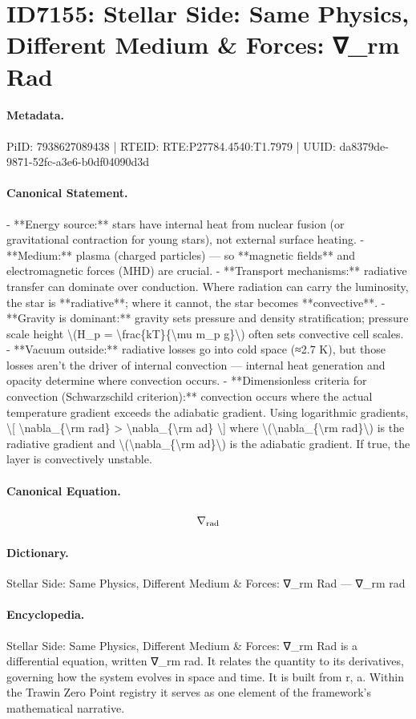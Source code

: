 \section*{ID7155: Stellar Side: Same Physics, Different Medium \& Forces: ∇\_rm Rad}
\paragraph{Metadata.}
PiID: 7938627089438 | RTEID: RTE:P27784.4540:T1.7979 | UUID: da8379de-9871-52fc-a3e6-b0df04090d3d

\paragraph{Canonical Statement.}
- **Energy source:** stars have internal heat from nuclear fusion (or gravitational contraction for young stars), not external surface heating. - **Medium:** plasma (charged particles) — so **magnetic fields** and electromagnetic forces (MHD) are crucial. - **Transport mechanisms:** radiative transfer can dominate over conduction. Where radiation can carry the luminosity, the star is **radiative**; where it cannot, the star becomes **convective**. - **Gravity is dominant:** gravity sets pressure and density stratification; pressure scale height \textbackslash{}(H\_p = \textbackslash{}frac\{kT\}\{\textbackslash{}mu m\_p g\}\textbackslash{}) often sets convective cell scales. - **Vacuum outside:** radiative losses go into cold space (≈2.7 K), but those losses aren’t the driver of internal convection — internal heat generation and opacity determine where convection occurs. - **Dimensionless criteria for convection (Schwarzschild criterion):** convection occurs where the actual temperature gradient exceeds the adiabatic gradient. Using logarithmic gradients, \textbackslash{}[ \textbackslash{}nabla\_\{\textbackslash{}rm rad\} > \textbackslash{}nabla\_\{\textbackslash{}rm ad\} \textbackslash{}] where \textbackslash{}(\textbackslash{}nabla\_\{\textbackslash{}rm rad\}\textbackslash{}) is the radiative gradient and \textbackslash{}(\textbackslash{}nabla\_\{\textbackslash{}rm ad\}\textbackslash{}) is the adiabatic gradient. If true, the layer is convectively unstable.

\paragraph{Canonical Equation.}
\[
\nabla_{\rm rad}
\]

\paragraph{Dictionary.}
Stellar Side: Same Physics, Different Medium \& Forces: ∇\_rm Rad — ∇\_rm rad

\paragraph{Encyclopedia.}
Stellar Side: Same Physics, Different Medium \& Forces: ∇\_rm Rad is a differential equation, written ∇\_rm rad. It relates the quantity to its derivatives, governing how the system evolves in space and time. It is built from r, a. Within the Trawin Zero Point registry it serves as one element of the framework's mathematical narrative.
